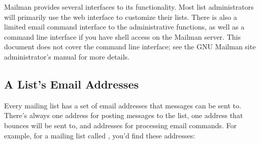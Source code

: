 \documentclass{howto}
\begin{document}
Mailman provides several interfaces to its functionality.  Most list
administrators will primarily use the web interface to customize their
lists.  There is also a limited email command interface to the
administrative functions, as well as a command line interface if you
have shell access on the Mailman server.  This document does not cover
the command line interface; see the GNU Mailman site administrator's
manual for more details.

\subsection{A List's Email Addresses}

Every mailing list has a set of email addresses that messages can be
sent to.  There's always one address for posting messages to the list,
one address that bounces will be sent to, and addresses for processing
email commands.  For example, for a mailing list called
, you'd find these addresses:
\end{document}
